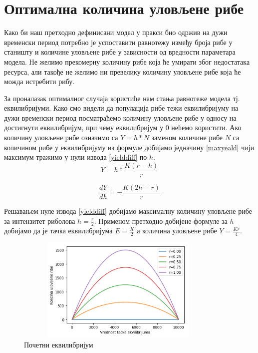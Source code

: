 \documentclass[a4paper]{article}
\begin{document}
{\section{Оптимална количина уловљене рибе}
\label{sec:fishingoptimum}
Како би наш претходно дефинисани модел у пракси био одржив на дужи временски период потребно је успоставити равнотежу између броја рибе у станишту и количине уловљене рибе у зависности од вредности параметара модела. Не желимо прекомерну количину рибе која ће умирати због недостатака ресурса, али такође не желимо ни превелику количину уловљене рибе која ће можда истребити рибу.

За проналазак оптималног случаја користиће нам стања равнотеже модела тј. еквилибријуми. Како смо видели да популација рибе тежи еквилибријуму на дужи временски период посматраћемо количину уловљене рибе у односу на достигнути еквилибријум, при чему еквилибријум у $0$ нећемо користити. 
Ако количину уловљене рибе означимо са $Y = h*N$ заменом количине рибе $N$ са количином рибе у еквилибријуму из формуле добијамо једначину \ref{maxyeald} чији максимум тражимо у нули извода \ref{yielddiff} по $h$.
\begin{equation}
    \label{maxyeald}
    Y = h*\frac{K(r - h) }{r}
\end{equation}

\begin{equation}
    \label{yielddiff}
     \frac{dY}{dh} = -\frac{K(2h - r) }{r}
\end{equation}

Решавањем нуле извода \ref{yielddiff} добијамо максималну количину уловљене рибе за интензитет риболова $h=\frac{r}{2}$. Применом претходно добијене формуле за $h$ добијамо да је тачка еквилибријума $E=\frac{K}{2}$ а количина уловљене рибе $Y=\frac{Kr}{4}$. 

\begin{figure}[h!]
	\centering
	\includegraphics[width=10cm,height=5.0cm]{images/OptimalHarvest.png}
	\caption{Почетни еквилибријум}
	\label{optimalHarvest}
\end{figure}


}
\end{document}
